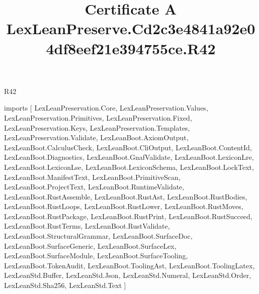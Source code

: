 \begin{lexlean}{R42}
\title{Certificate A LexLeanPreserve.Cd2c3e4841a92e04df8eef21e394755ce.R42}
\begin{coremodule}
imports [
  LexLeanPreservation.Core,
  LexLeanPreservation.Values,
  LexLeanPreservation.Primitives,
  LexLeanPreservation.Fixed,
  LexLeanPreservation.Keys,
  LexLeanPreservation.Templates,
  LexLeanPreservation.Validate,
  LexLeanBoot.AxiomOutput,
  LexLeanBoot.CalculusCheck,
  LexLeanBoot.CliOutput,
  LexLeanBoot.ContentId,
  LexLeanBoot.Diagnostics,
  LexLeanBoot.GnafValidate,
  LexLeanBoot.LexiconLre,
  LexLeanBoot.LexiconLse,
  LexLeanBoot.LexiconSchema,
  LexLeanBoot.LockText,
  LexLeanBoot.ManifestText,
  LexLeanBoot.PrimitiveScan,
  LexLeanBoot.ProjectText,
  LexLeanBoot.RuntimeValidate,
  LexLeanBoot.RustAssemble,
  LexLeanBoot.RustAst,
  LexLeanBoot.RustBodies,
  LexLeanBoot.RustLoops,
  LexLeanBoot.RustLower,
  LexLeanBoot.RustMoves,
  LexLeanBoot.RustPackage,
  LexLeanBoot.RustPrint,
  LexLeanBoot.RustSucceed,
  LexLeanBoot.RustTerms,
  LexLeanBoot.RustValidate,
  LexLeanBoot.StructuralGrammar,
  LexLeanBoot.SurfaceDoc,
  LexLeanBoot.SurfaceGeneric,
  LexLeanBoot.SurfaceLex,
  LexLeanBoot.SurfaceModule,
  LexLeanBoot.SurfaceTooling,
  LexLeanBoot.TokenAudit,
  LexLeanBoot.ToolingAst,
  LexLeanBoot.ToolingLatex,
  LexLeanStd.Buffer,
  LexLeanStd.Json,
  LexLeanStd.Numeral,
  LexLeanStd.Order,
  LexLeanStd.Sha256,
  LexLeanStd.Text
]


\end{coremodule}
\end{lexlean}
